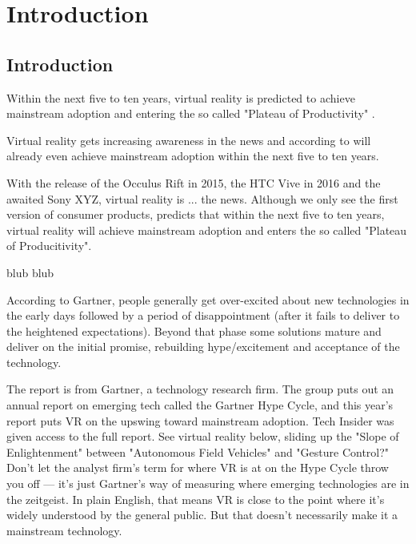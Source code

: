 
\chapter{Introduction} %

\label{ChapterIntroduction} %


\section{Introduction}

Within the next five to ten years, virtual reality is predicted to achieve mainstream adoption and entering the so called "Plateau of Productivity" \citep{Gartner2015}.

Virtual reality gets increasing awareness in the news and according to \cite{Gartner2015} will already even achieve mainstream adoption within the next five to ten years.

With the release of the Occulus Rift in 2015, the HTC Vive in 2016 and the awaited Sony XYZ, virtual reality is ... the news. Although we only see the first version of consumer products, \cite{Gartner2015} predicts that within the next five to ten years, virtual reality will achieve mainstream adoption and enters the so called "Plateau of Producitivity".

blub
\cite{Safrudin2015}
blub


According to Gartner, people generally get over-excited about new technologies in the early days followed by a period of disappointment (after it fails to deliver to the heightened expectations). Beyond that phase some solutions mature and deliver on the initial promise, rebuilding hype/excitement and acceptance of the technology.


 The report is from Gartner, a technology research firm. The group puts out an annual report on emerging tech called the Gartner Hype Cycle, and this year's report puts VR on the upswing toward mainstream adoption. Tech Insider was given access to the full report.
 See virtual reality below, sliding up the "Slope of Enlightenment" between "Autonomous Field Vehicles" and "Gesture Control?" Don't let the analyst firm's term for where VR is at on the Hype Cycle throw you off — it's just Gartner's way of measuring where emerging technologies are in the zeitgeist.
 In plain English, that means VR is close to the point where it's widely understood by the general public. But that doesn't necessarily make it a mainstream technology. 

